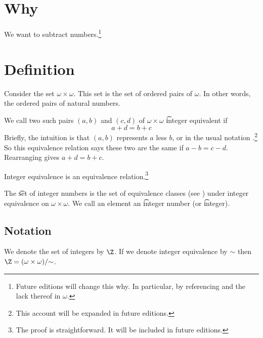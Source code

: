 

\section*{Why}

We want to subtract numbers.\footnote{Future editions will change this why. In particular, by referencing and the lack thereof in $\omega $.}

\section*{Definition}

Consider the set $\omega  \times \omega $.
This set is the set of ordered pairs of $\omega $.
In other words, the ordered pairs of natural numbers.

We call two such pairs $(a, b)$ and $(c, d)$ of $\omega \times  \omega $ \t{integer equivalent} if
    \[
a + d = b + c
    \]
Briefly, the intuition is that $(a, b)$ represents $a$ less $b$, or in the usual notation .\footnote{This account will be expanded in future editions.}
So this equivalence relation says these two are the same if $a - b = c - d$.
Rearranging gives $a + d = b + c$.

\begin{proposition}
Integer equivalence is an equivalence relation.\footnote{The proof is straightforward. It will be included in future editions.}\end{proposition}
The \t{set of integer numbers} is the set of equivalence classes (see ) under integer equivalence on $\omega  \times  \omega $.
We call an element an \t{integer number} (or \t{integer}).

\subsection*{Notation}

We denote the set of integers by $\Z $.
If we denote integer equivalence by $\sim$ then $\Z  = (\omega \times \omega )/\mathord{\sim}$.
